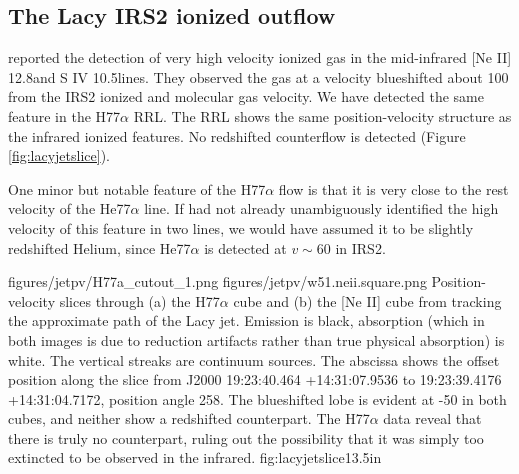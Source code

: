 \subsection{The Lacy IRS2 ionized outflow}
\label{sec:lacyjet}
\citet{Lacy2007a} reported the detection of very high velocity ionized gas
in the mid-infrared [Ne II] 12.8\um and S IV 10.5\um lines.  They observed the
gas at a velocity blueshifted about 100 \kms from the IRS2 ionized and molecular
gas velocity.  We have detected the same feature in the H77$\alpha$ RRL.
The RRL shows the same position-velocity structure as the infrared ionized
features.  No redshifted counterflow is detected (Figure \ref{fig:lacyjetslice}).

One minor but notable feature of the H77$\alpha$ flow is that it is very close
to the rest velocity of the He77$\alpha$ line.  If \citet{Lacy2007a} had not
already unambiguously identified the high velocity of this feature in two
lines, we would have assumed it to be slightly redshifted Helium, since
He77$\alpha$ is detected at $v\sim60$ \kms in IRS2.

\FigureTwo
{figures/jetpv/H77a_cutout_1.png}
{figures/jetpv/w51.neii.square.png}
{Position-velocity slices through (a) the H77$\alpha$ cube and (b) the [Ne II]
cube from \citet{Lacy2007a} tracking the approximate path of the Lacy jet.  Emission is black,
absorption (which in both images is due to reduction artifacts rather than true
physical absorption) is white.  The vertical streaks are continuum sources.
The
abscissa shows the offset position along the slice from J2000 19:23:40.464
+14:31:07.9536 to 19:23:39.4176 +14:31:04.7172, position angle 258\arcdeg.
The blueshifted lobe is evident at -50 \kms in both cubes, and neither show a
redshifted counterpart.  The H77$\alpha$ data reveal that there is truly no
counterpart, ruling out the possibility that it was simply too extincted to be
observed in the infrared.}
{fig:lacyjetslice}{1}{3.5in}



